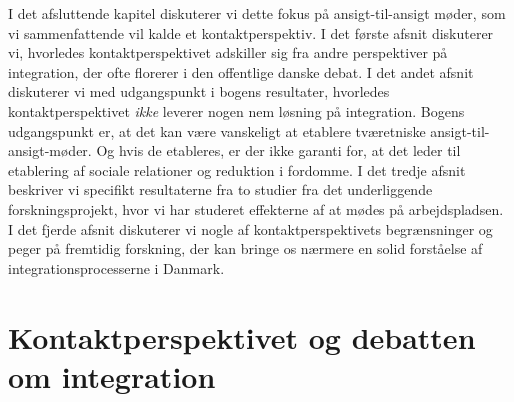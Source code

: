 \documentclass[
]{book}
\begin{document}
I det afsluttende kapitel diskuterer vi dette fokus på ansigt-til-ansigt møder, som vi sammenfattende vil kalde et kontaktperspektiv. I det første afsnit diskuterer vi, hvorledes kontaktperspektivet adskiller sig fra andre perspektiver på integration, der ofte florerer i den offentlige danske debat. I det andet afsnit diskuterer vi med udgangspunkt i bogens resultater, hvorledes kontaktperspektivet \emph{ikke} leverer nogen nem løsning på integration. Bogens udgangspunkt er, at det kan være vanskeligt at etablere tværetniske ansigt-til-ansigt-møder. Og hvis de etableres, er der ikke garanti for, at det leder til etablering af sociale relationer og reduktion i fordomme. I det tredje afsnit beskriver vi specifikt resultaterne fra to studier fra det underliggende forskningsprojekt, hvor vi har studeret effekterne af at mødes på arbejdspladsen. I det fjerde afsnit diskuterer vi nogle af kontaktperspektivets begrænsninger og peger på fremtidig forskning, der kan bringe os nærmere en solid forståelse af integrationsprocesserne i Danmark.

\section{Kontaktperspektivet og debatten om integration}\label{kontaktperspektivet-og-debatten-om-integration}
\end{document}

